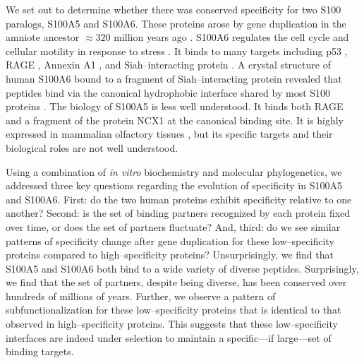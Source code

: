 We set out to determine whether there was conserved specificity for
two S100 paralogs, S100A5 and S100A6. These proteins arose by gene
duplication in the amniote ancestor $\approx320$ million years ago
\citep{hedges_timetree:_2006,wheeler_multiple_2016}. S100A6 regulates
the cell cycle and cellular motility in response to stress \citep{lesniak_s100a6_2009}.
It binds to many targets including p53  \citep{slomnicki_s100a6_2009,van_dieck_modulation_2009},
RAGE \citep{leclerc_binding_2009}, Annexin A1 \citep{streicher_annexin_2009},
and Siah--interacting protein \citep{lee_structure_2008}. A crystal
structure of human S100A6 bound to a fragment of Siah--interacting
protein revealed that peptides bind via the canonical hydrophobic
interface shared by most S100 proteins \citep{lee_structure_2008}.
The biology of S100A5 is less well understood. It binds both RAGE
\citep{leclerc_binding_2009,cho_pentamidine_2016} and a fragment
of the protein NCX1 \citep{liriano_structure_2012} at the canonical
binding site. It is highly expressed in mammalian olfactory tissues
\citep{knott_olfactory_2012,mcintyre_gene_2012,olender_human_2016},
but its specific targets and their biological roles are not well understood. 

Using a combination of \textit{in vitro} biochemistry and molecular
phylogenetics, we addressed three key questions regarding the evolution
of specificity in S100A5 and S100A6. First: do the two human proteins
exhibit specificity relative to one another? Second: is the set of
binding partners recognized by each protein fixed over time, or does
the set of partners fluctuate? And, third: do we see similar patterns
of specificity change after gene duplication for these low--specificity
proteins compared to high--specificity proteins? Unsurprisingly, we
find that S100A5 and S100A6 both bind to a wide variety of diverse
peptides. Surprisingly, we find that the set of partners, despite
being diverse, has been conserved over hundreds of millions of years.
Further, we observe a pattern of subfunctionalization for these low--specificity
proteins that is identical to that observed in high--specificity proteins.
This suggests that these low--specificity interfaces are indeed under
selection to maintain a specific---if large---set of binding targets. 


